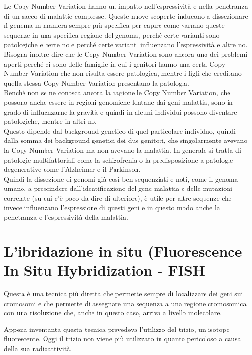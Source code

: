 \documentclass[11pt]{book}
\begin{document}
Le Copy Number Variation hanno un impatto nell’espressività e nella penetranza di un sacco di malattie complesse. Queste nuove scoperte inducono a dissezionare il genoma in maniera sempre più specifica per capire come variano queste sequenze in una specifica regione del genoma, perché certe varianti sono patologiche e certe no e perché certe varianti influenzano l’espressività e altre no.\\
Bisogna inoltre dire che le Copy Number Variation sono ancora uno dei problemi aperti perché ci sono delle famiglie in cui i genitori hanno una certa Copy Number Variation che non risulta essere patologica, mentre i figli che ereditano quella stessa Copy Number Variation presentano la patologia.\\
Benchè non se ne conosca ancora la ragione le Copy Number Variation, che possono anche essere in regioni genomiche lontane dai geni-malattia, sono in grado di influenzarne la gravità e quindi in alcuni individui possono diventare patologiche, mentre in altri no.\\
Questo dipende dal background genetico di quel particolare individuo, quindi dalla somma dei background genetici dei due genitori, che singolarmente avevano la Copy Number Variation ma non avevano la malattia.
In generale si tratta di patologie multifattoriali come la schizofrenia o la predisposizione a patologie degenerative come l’Alzheimer e il Parkinson.\\
Quindi la dissezione di genomi già così ben sequenziati e noti, come il genoma umano, a prescindere dall’identificazione del gene-malattia e delle mutazioni correlate (su cui c’è poco da dire di ulteriore), è utile per altre sequenze che invece influenzano l’espressione di questi geni e in questo modo anche la penetranza e l’espressività della malattia.


\section{L'ibridazione in situ (Fluorescence In Situ Hybridization - FISH}
Questa è una tecnica più diretta che permette sempre di localizzare dei geni sui cromosomi e che permette di assegnare una sequenza a una regione cromosomica con una risoluzione che, anche in questo caso, arriva a livello molecolare.

Appena inventanta questa tecnica prevedeva l'utilizzo del trizio, un isotopo fluorescente. Oggi il trizio non viene più utilizzato in quanto pericoloso a causa della sua radioattività.
\end{document}
